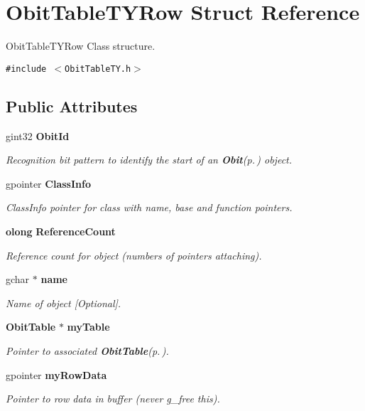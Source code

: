\section{Obit\-Table\-TYRow Struct Reference}
\label{structObitTableTYRow}
Obit\-Table\-TYRow Class structure.  


{\tt \#include $<$Obit\-Table\-TY.h$>$}

\subsection*{Public Attributes}
\begin{CompactItemize}
\item 
gint32 {\bf Obit\-Id}
\begin{CompactList}\small\item\em Recognition bit pattern to identify the start of an {\bf Obit}{\rm (p.\,\pageref{structObit})} object. \item\end{CompactList}\item 
gpointer {\bf Class\-Info}
\begin{CompactList}\small\item\em Class\-Info pointer for class with name, base and function pointers. \item\end{CompactList}\item 
{\bf olong} {\bf Reference\-Count}
\begin{CompactList}\small\item\em Reference count for object (numbers of pointers attaching). \item\end{CompactList}\item 
gchar $\ast$ {\bf name}
\begin{CompactList}\small\item\em Name of object [Optional]. \item\end{CompactList}\item 
{\bf Obit\-Table} $\ast$ {\bf my\-Table}
\begin{CompactList}\small\item\em Pointer to associated {\bf Obit\-Table}{\rm (p.\,\pageref{structObitTable})}. \item\end{CompactList}\item 
gpointer {\bf my\-Row\-Data}
\begin{CompactList}\small\item\em Pointer to row data in buffer (never g\_\-free this). \item\end{CompactList}\item 

\end{CompactItemize}
